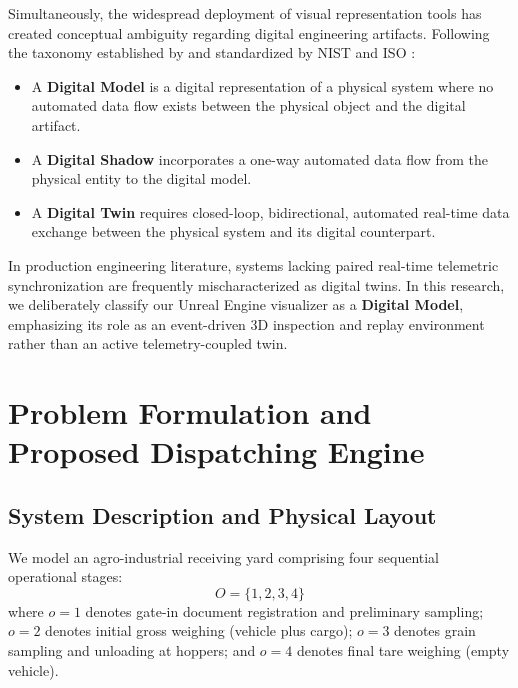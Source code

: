 \documentclass[11pt,a4paper]{article}
\begin{document}
Simultaneously, the widespread deployment of visual representation tools has created conceptual ambiguity regarding digital engineering artifacts. Following the taxonomy established by \textcite{kritzingerDigitalTwinManufacturing2018} and standardized by NIST \parencite{nistDigitalTwinsEssentialElements2026} and ISO \parencite{isoSmartManufacturingWhitePaper2021}:
\begin{itemize}[leftmargin=1.2cm,itemsep=0pt,topsep=2pt]
  \item A \textbf{Digital Model} is a digital representation of a physical system where no automated data flow exists between the physical object and the digital artifact.
  \item A \textbf{Digital Shadow} incorporates a one-way automated data flow from the physical entity to the digital model.
  \item A \textbf{Digital Twin} requires closed-loop, bidirectional, automated real-time data exchange between the physical system and its digital counterpart.
\end{itemize}
In production engineering literature, systems lacking paired real-time telemetric synchronization are frequently mischaracterized as digital twins. In this research, we deliberately classify our Unreal Engine visualizer as a \textbf{Digital Model}, emphasizing its role as an event-driven 3D inspection and replay environment rather than an active telemetry-coupled twin.

\section{Problem Formulation and Proposed Dispatching Engine}
\label{sec:model}

\subsection{System Description and Physical Layout}
We model an agro-industrial receiving yard comprising four sequential operational stages:
\begin{equation}
  O = \{1, 2, 3, 4\}
\end{equation}
where $o=1$ denotes gate-in document registration and preliminary sampling; $o=2$ denotes initial gross weighing (vehicle plus cargo); $o=3$ denotes grain sampling and unloading at hoppers; and $o=4$ denotes final tare weighing (empty vehicle). 
\end{document}

